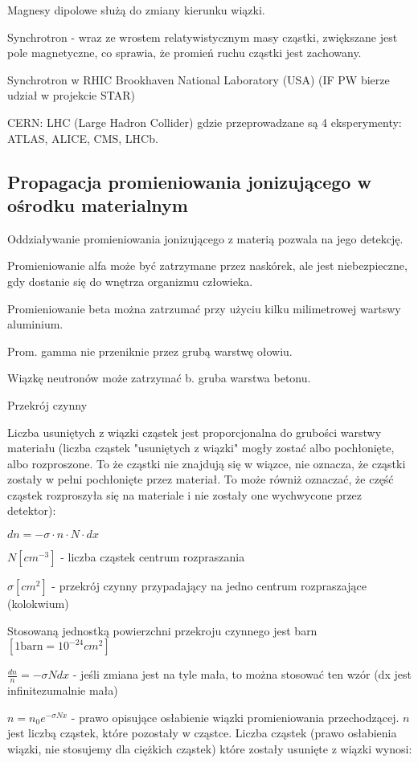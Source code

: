 \documentclass{article}
\begin{document}
Magnesy dipolowe służą do zmiany kierunku wiązki.

Synchrotron - wraz ze wrostem relatywistycznym masy cząstki, zwiększane jest pole magnetyczne, co sprawia, że promień ruchu cząstki jest zachowany.

Synchrotron w RHIC Brookhaven National Laboratory (USA) (IF PW bierze udział w projekcie STAR)

CERN: LHC (Large Hadron Collider) gdzie przeprowadzane są 4 eksperymenty: ATLAS, ALICE, CMS, LHCb.

\subsection{Propagacja promieniowania jonizującego w ośrodku materialnym}

Oddziaływanie promieniowania jonizującego z materią pozwala na jego detekcję.

Promieniowanie alfa może być zatrzymane przez naskórek, ale jest niebezpieczne, gdy dostanie się do wnętrza organizmu człowieka.

Promieniowanie beta można zatrzumać przy użyciu kilku milimetrowej wartswy aluminium.

Prom. gamma nie przeniknie przez grubą warstwę ołowiu.

Wiązkę neutronów może zatrzymać b. gruba warstwa betonu.

Przekrój czynny

Liczba usuniętych z wiązki cząstek jest proporcjonalna do grubości warstwy materiału (liczba cząstek "usuniętych z wiązki" mogły zostać albo pochłonięte, albo rozproszone. To że cząstki nie znajdują się w wiązce, nie oznacza, że cząstki zostały w pełni pochłonięte przez materiał. To może równiż oznaczać, że część cząstek rozproszyła się na materiale i nie zostały one wychwycone przez detektor):

$dn = -\sigma \cdot n \cdot N \cdot dx$

$N [cm^{-3}]$ - liczba cząstek centrum rozpraszania

$\sigma [cm^2]$ - przekrój czynny przypadający na jedno centrum rozpraszające (kolokwium)

Stosowaną jednostką powierzchni przekroju czynnego jest barn $[1\mathrm{barn}=10^{-24} cm^2]$

$\frac{dn}{n} = -\sigma N dx$ - jeśli zmiana jest na tyle mała, to można stosować ten wzór (dx jest infinitezumalnie mała)

$n = n_0e^{-\sigma N x}$ - prawo opisujące osłabienie wiązki promieniowania przechodzącej. $n$ jest liczbą cząstek, które pozostały w cząstce. Liczba cząstek (prawo osłabienia wiązki, nie stosujemy dla ciężkich cząstek) które zostały usunięte z wiązki wynosi:
\end{document}
